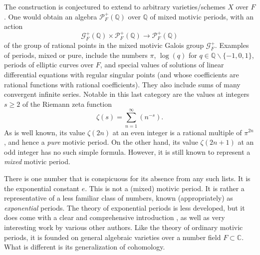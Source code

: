 \documentclass[preprint,12pt, leqno]{elsarticle}
\newcommand{\UGal}{\mathcal{G}_F}
\newcommand{\PQ}{\cP_F^+(\mQ)}
\newcommand{\mQ}{\mathbb{Q}}
\newcommand{\mC}{\mathbb{C}}
\newcommand{\cP}{\mathcal{P}}
\newcommand{\ubf}[1]{\textit{#1}}
\numberwithin{equation}{section}
\theoremstyle{named}
\begin{document}
The construction is conjectured to extend to arbitrary varieties/schemes $X$ over $F$. One would obtain an algebra $\PQ$ over $\mQ$ of mixed motivic periods, with an action
\begin{equation*}
    \UGal^+(\mQ) \times \PQ \longrightarrow \PQ
\end{equation*}
of the group of rational points in the mixed motivic Galois group $\UGal^+$. Examples of periods, mixed or pure, include the numbers $\pi$, $\log(q)$ for $q\in\mQ\backslash\{-1, 0, 1\}$, periods of elliptic curves over $F$, and special values of solutions of linear differential equations with regular singular points (and whose coefficients are rational functions with rational coefficients). They also include sums of many convergent infinite series. Notable in this last category are the values at integers $s\ge 2$ of the Riemann zeta function
\begin{equation*}
    \zeta(s) = \displaystyle\sum_{n = 1}^{\infty} (n^{-s}).
\end{equation*}
As is well known, its value $\zeta(2n)$ at an even integer is a rational multiple of $\pi^{2n}$, and hence a \ubf{pure} motivic period. On the other hand, its value $\zeta(2n + 1)$ at an odd integer has no such simple formula. However, it is still known to represent a \ubf{mixed} motivic period.

There is one number that is conspicuous for its absence from any such lists. It is the exponential constant $e$. This is not a (mixed) motivic period. It is rather a representative of a less familiar class of numbers, known (appropriately) as \ubf{exponential} periods. The theory of exponential periods is less developed, but it does come with a clear and comprehensive introduction \cite{FJ}, as well as very interesting work by various other authors. Like the theory of ordinary motivic periods, it is founded on general algebraic varieties over a number field $F\subset\mC$. What is different is its generalization of cohomology.
\end{document}
